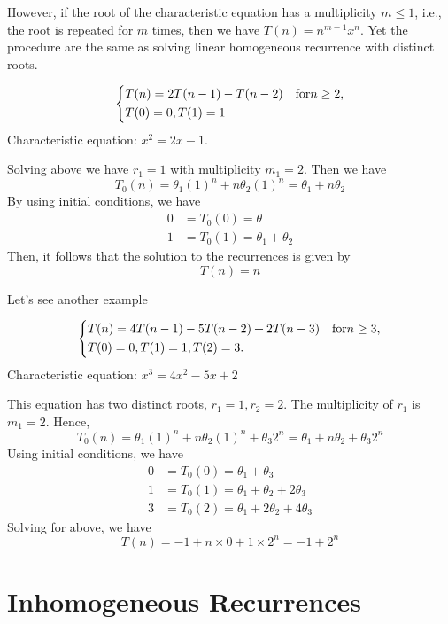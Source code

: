 However, if the root of the characteristic equation has a multiplicity \(m \leq 1\), i.e., the root is repeated for \(m\)  times, then we have \(T(n) = n^{m-1}x^n\). Yet the procedure are the same as solving linear homogeneous recurrence with distinct roots. 

\begin{eg}
    \[
        \begin{dcases}
            T(n) = 2T(n - 1) - T(n - 2)\quad\text{for} n \geq 2,\\
            T(0) = 0, T(1) = 1\\
        \end{dcases}
    \]
    Characteristic equation: \(x^2 = 2x - 1\). 

    Solving above we have \(r_1 = 1\) with multiplicity \(m_1 = 2\).
    Then we have
    \[
        T_0(n) = \theta_1 (1)^n + n\theta_2(1)^n = \theta_1+ n\theta_2
    \]
    By using initial conditions, we have
    \[
        \begin{aligned}
            0 &= T_0(0) = \theta \\
            1 &= T_0(1) = \theta_1 + \theta_2
        \end{aligned}
    \]
    Then, it follows that the solution to the recurrences is given by
    \[
        T(n) = n
    \]
\end{eg}

Let's see another example
\begin{eg}
\[
    \begin{dcases}
        T(n) = 4T(n-1) - 5T(n-2) + 2T(n-3)\quad\text{for} n\geq 3,\\
        T(0) = 0, T(1) = 1, T(2) = 3.
    \end{dcases}
\]
Characteristic equation: \(x^3 = 4x^2 - 5x + 2\) 

This equation has two distinct roots, \(r_1 = 1, r_2 = 2\). The multiplicity of \(r_1\) is \(m_1 = 2\). Hence,
\[
    T_0(n) = \theta_1 (1)^n + n\theta_2 (1)^n + \theta_3 2^n = \theta_1 + n\theta_2 + \theta_3 2^n
\]
Using initial conditions, we have
\[
    \begin{aligned}
        0 &= T_0(0) = \theta_1 + \theta_3 \\
        1 &= T_0(1) = \theta_1 + \theta_2 + 2\theta_3 \\
        3 &= T_0(2) = \theta_1 + 2\theta_2 + 4\theta_3
    \end{aligned}
\]
Solving for above, we have
\[
    T(n) = -1 + n\times0 + 1 \times 2^n = -1 + 2^n
\]
\end{eg}

\section{Inhomogeneous Recurrences}